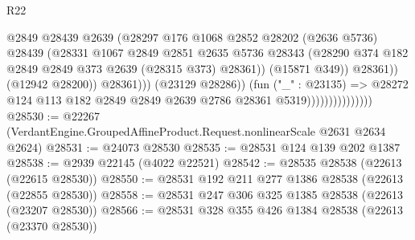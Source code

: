 \begin{lexlean}{R22}
\begin{coremodule}
                                              @2849
                                              @28439
                                              @2639
                                              (@28297
                                                @176
                                                @1068
                                                @2852
                                                @28202
                                                (@2636 @5736)
                                                @28439
                                                (@28331
                                                  @1067
                                                  @2849
                                                  @2851
                                                  @2635
                                                  @5736
                                                  @28343
                                                  (@28290
                                                    @374
                                                    @182
                                                    @2849
                                                    @2849
                                                    @373
                                                    @2639
                                                    (@28315 @373)
                                                    @28361))
                                                (@15871 @349))
                                              @28361))
                                          (@12942 @28200))
                                        @28361)))
                                  (@23129 @28286))
                                (fun ("_" : @23135) =>
                                @28272
                                  @124
                                  @113
                                  @182
                                  @2849
                                  @2849
                                  @2639
                                  @2786
                                  @28361
                                  @5319)))))))))))))))
@28530 := @22267 (VerdantEngine.GroupedAffineProduct.Request.nonlinearScale @2631 @2634 @2624)
@28531 := @24073 @28530
@28535 := @28531 @124 @139 @202 @1387
@28538 := @2939 @22145 (@4022 @22521)
@28542 := @28535 @28538 (@22613 (@22615 @28530))
@28550 := @28531 @192 @211 @277 @1386 @28538 (@22613 (@22855 @28530))
@28558 := @28531 @247 @306 @325 @1385 @28538 (@22613 (@23207 @28530))
@28566 := @28531 @328 @355 @426 @1384 @28538 (@22613 (@23370 @28530))

\end{coremodule}
\end{lexlean}
